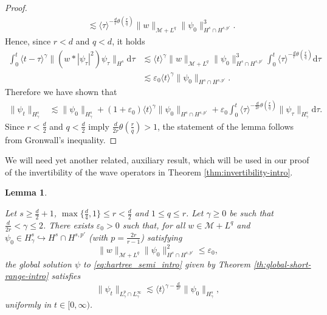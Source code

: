 \documentclass[12pt]{article}
\theoremstyle{plain}
\newtheorem{lemma}[theo]{Lemma}
\newcommand{\meas}{\mathcal{M}}
\begin{document}
\begin{proof}
\begin{align}
&\lesssim \langle\tau\rangle^{-\frac dr \theta(\frac{r}{q})}\|w\|_{\meas+L^{q}} \|\psi_0\|_{H^s\cap H^{s,p'}}^3. \label{comp:for bound of G gamma}
\end{align}
Hence, since $r<d$ and $q<d$, it holds
\begin{align*}
    \int_0^t \langle t-\tau\rangle^\gamma\big\|(w * |\psi_\tau|^2)\psi_\tau\big\|_{H^s}\mathrm{d}\tau &\lesssim  \langle t\rangle^\gamma   \|w\|_{\meas+L^{q}} \|\psi_0\|_{H^s\cap H^{s,p'}}^3 \int_0^t\langle\tau\rangle^{-\frac dr\theta(\frac{r}{q})}\mathrm{d}\tau \\
    &\lesssim \varepsilon_0 \langle t\rangle^\gamma  \|\psi_0\|_{H^s\cap H^{s,p'}}. 
\end{align*}
Therefore we have shown that 
\begin{align*}
    \|\psi_t\|_{H^s_\gamma} &\lesssim \|\psi_0\|_{H^s_\gamma} +(1+\varepsilon_0)\langle t\rangle^\gamma\|\psi_0\|_{H^s\cap H^{s,p'}}
      +\varepsilon_0 \int_0^t \langle \tau\rangle^{-\frac{d}{2r}\theta(\frac{r}{q})} \|\psi_\tau\|_{H^s_\gamma} \mathrm{d}\tau. 
\end{align*}
Since $r<\frac d2$ and $q<\frac d2$ imply $\frac{d}{2r}\theta(\frac{r}{q})>1$, the statement of the lemma follows from Gronwall's inequality.
\end{proof}

We will need yet another related, auxiliary result, which will be used in our proof of the invertibility of the wave operators in Theorem \ref{thm:invertibility-intro}.


\begin{lemma}\label{eq:estim_2S}
  
    
   Let $s\ge\frac{d}{2}+1$, $\max \{ \frac{d}{4}, 1\}\le r <\frac d2$ and $1\le q\le r$.   Let  $\gamma\ge0$ be such that $\frac{d}{2r}<\gamma\le2$. There exists $\varepsilon_0>0$ such that, for all  $w \in \meas+L^{q}$ and $\psi_0\in H^s_\gamma\hookrightarrow H^s\cap H^{s,p'}$ (with $p=\frac{2r}{r-1}$) satisfying
		\begin{equation*}
			\|w\|_{\meas+L^{q}} \| \psi_0\|^2_{H^s\cap H^{s,p'}}\le\varepsilon_0,
		\end{equation*} 
		the global solution $\psi$ to \eqref{eq:hartree_semi_intro} given by Theorem \ref{th:global-short-range-intro} satisfies
		\begin{equation}\label{eq:estimate-Lpgamma}
		  \|\psi_t\|_{L^{p}_\gamma\cap L^\infty_\gamma}\lesssim\langle t\rangle^{\gamma-\frac{d}{2r}}\| \psi_0\|_{H^s_\gamma},
		\end{equation}
		uniformly in $t\in[0,\infty)$.
\end{lemma}
\end{document}
